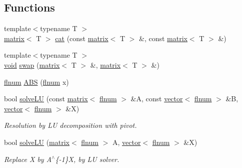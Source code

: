 \subsection*{Functions}
\begin{DoxyCompactItemize}
\item 
{\footnotesize template$<$typename T $>$ }\\\hyperlink{classlibNumerics_1_1matrix}{matrix}$<$ T $>$ \hyperlink{namespacelibNumerics_a9a38d6b5bcfe38eda9fe9044f9503035}{cat} (const \hyperlink{classlibNumerics_1_1matrix}{matrix}$<$ T $>$ \&, const \hyperlink{classlibNumerics_1_1matrix}{matrix}$<$ T $>$ \&)
\item 
{\footnotesize template$<$typename T $>$ }\\\hyperlink{png_8h_aa8c59027f9ab2769342f248709d68d17}{void} \hyperlink{namespacelibNumerics_ae875caf670c26d44ce34bfe5f555cb90}{swap} (\hyperlink{classlibNumerics_1_1matrix}{matrix}$<$ T $>$ \&, \hyperlink{classlibNumerics_1_1matrix}{matrix}$<$ T $>$ \&)
\item 
\hyperlink{namespacelibNumerics_ac94c07350f743d00e3dbcb33b6e974b0}{flnum} \hyperlink{namespacelibNumerics_aa930962fb0da51a6fc4578da5e3da2f1}{A\+B\+S} (\hyperlink{namespacelibNumerics_ac94c07350f743d00e3dbcb33b6e974b0}{flnum} x)
\item 
bool \hyperlink{namespacelibNumerics_a83b960893bb9aaf17a880a15b4a02e61}{solve\+L\+U} (const \hyperlink{classlibNumerics_1_1matrix}{matrix}$<$ \hyperlink{namespacelibNumerics_ac94c07350f743d00e3dbcb33b6e974b0}{flnum} $>$ \&A, const \hyperlink{classlibNumerics_1_1vector}{vector}$<$ \hyperlink{namespacelibNumerics_ac94c07350f743d00e3dbcb33b6e974b0}{flnum} $>$ \&B, \hyperlink{classlibNumerics_1_1vector}{vector}$<$ \hyperlink{namespacelibNumerics_ac94c07350f743d00e3dbcb33b6e974b0}{flnum} $>$ \&X)
\begin{DoxyCompactList}\small\item\em Resolution by L\+U decomposition with pivot. \end{DoxyCompactList}\item 
bool \hyperlink{namespacelibNumerics_ac993a04d2694e745c733feea22111a48}{solve\+L\+U} (\hyperlink{classlibNumerics_1_1matrix}{matrix}$<$ \hyperlink{namespacelibNumerics_ac94c07350f743d00e3dbcb33b6e974b0}{flnum} $>$ A, \hyperlink{classlibNumerics_1_1vector}{vector}$<$ \hyperlink{namespacelibNumerics_ac94c07350f743d00e3dbcb33b6e974b0}{flnum} $>$ \&X)
\begin{DoxyCompactList}\small\item\em Replace X by A$^\wedge$\{-\/1\}X, by L\+U solver. \end{DoxyCompactList}\end{DoxyCompactItemize}


